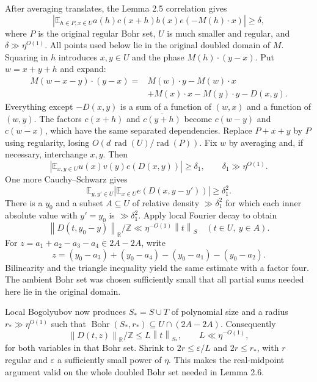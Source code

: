 \documentclass[11pt,a4paper]{article}
\newcommand{\E}{\mathbb E}
\newcommand{\T}{\mathbb R/\mathbb Z}
\newcommand{\Bohr}{\operatorname{Bohr}}
\newcommand{\abs}[1]{\left|#1\right|}
\newcommand{\norm}[1]{\left\|#1\right\|}
\theoremstyle{definition}
\numberwithin{equation}{section}
\begin{document}
After averaging translates, the Lemma 2.5 correlation gives
\[
\abs{\E_{h\in P,x\in U}a(h)c(x+h)b(x)e(-M(h)\cdot x)}\geq\delta,
\]
where $P$ is the original regular Bohr set, $U$ is much smaller and
regular, and $\delta\gg\eta^{O(1)}$. All points used below lie in the
original doubled domain of $M$. Squaring in $h$ introduces $x,y\in U$
and the phase $M(h)\cdot(y-x)$. Put $w=x+y+h$ and expand:
\[
\begin{aligned}
M(w-x-y)\cdot(y-x)
={}&M(w)\cdot y-M(w)\cdot x\\
&+M(x)\cdot x-M(y)\cdot y-D(x,y).
\end{aligned}
\]
Everything except $-D(x,y)$ is a sum of a function of $(w,x)$ and
a function of $(w,y)$. The factors $c(x+h)$ and
$\overline{c(y+h)}$ become $c(w-y)$ and $\overline{c(w-x)}$,
which have the same separated dependencies. Replace $P+x+y$ by $P$
using regularity, losing $O(d\,\operatorname{rad}(U)/\operatorname{rad}(P))$.
Fix $w$ by averaging and, if necessary, interchange $x,y$. Then
\[\abs{\E_{x,y\in U}u(x)v(y)e(D(x,y))}\geq\delta_1,
\qquad\delta_1\gg\eta^{O(1)}.\]
One more Cauchy--Schwarz gives
\[\E_{y,y'\in U}\abs{\E_{x\in U}e(D(x,y-y'))}\geq\delta_1^2.\]
There is a $y_0$ and a subset $A\subseteq U$ of relative density
$\gg\delta_1^2$ for which each inner absolute value with $y'=y_0$
is $\gg\delta_1^2$. Apply local Fourier decay to obtain
\[\norm{D(t,y_0-y)}_\T\ll\eta^{-O(1)}\norm{t}_S
\quad(t\in U,\ y\in A).\]
For $z=a_1+a_2-a_3-a_4\in2A-2A$, write
\[z=(y_0-a_3)+(y_0-a_4)-(y_0-a_1)-(y_0-a_2).\]
Bilinearity and the triangle inequality yield the same estimate with a
factor four. The ambient Bohr set was chosen sufficiently small that all
partial sums needed here lie in the original domain.

Local Bogolyubov now produces $S_*=S\cup T$ of polynomial size and a
radius $r_*\gg\eta^{O(1)}$ such that
$\Bohr(S_*,r_*)\subseteq U\cap(2A-2A)$. Consequently
\[\norm{D(t,z)}_\T\leq L\norm{t}_{S_*},\qquad L\ll\eta^{-O(1)},\]
for both variables in that Bohr set. Shrink to $2r\leq\varepsilon/L$
and $2r\leq r_*$, with $r$ regular and $\varepsilon$ a sufficiently
small power of $\eta$. This makes the real-midpoint argument valid on
the whole doubled Bohr set needed in Lemma 2.6.
\end{document}
